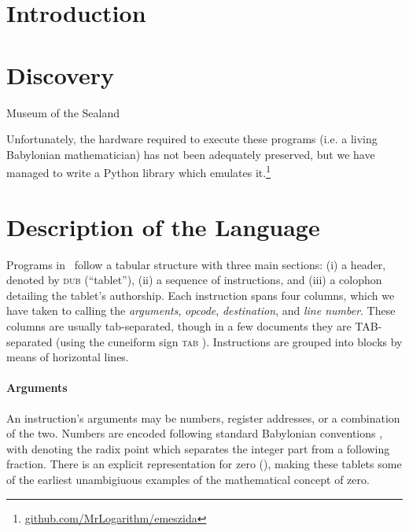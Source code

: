 \documentclass[11pt]{article}
\title{\emeszida}
\author{First Author \\
  Affiliation / Address line 1 \\
  Affiliation / Address line 2 \\
  Affiliation / Address line 3 \\
  \texttt{email@domain} \\\And
  Second Author \\
  Affiliation / Address line 1 \\
  Affiliation / Address line 2 \\
  Affiliation / Address line 3 \\
  \texttt{email@domain} \\}
\newcommand{\emeszida}{\textcuneiform{𒅴𒋃𒀀}}
\begin{document}
\maketitle
\begin{abstract}
This paper announces the discovery of the use of neural nets almost 4,000 years before their use in the modern era.
Newly discovered tablets preserve a perceptron used for calculating the numbers on Plimpton 322, the most important object in the history of mathematics.
The native programming language used by the ancient Babylonian "cuneogrammers" uses sexagesimal numbering leading to some "weirdness".
\end{abstract}

\begin{abstract}[]
test
\end{abstract}

\section{Introduction}

\cite{robson2002}

\section{Discovery}
Museum of the Sealand

Unfortunately, the hardware required to execute these programs (i.e. a living Babylonian mathematician) has not been adequately preserved, but we have managed to write a Python library which emulates it.\footnote{\url{github.com/MrLogarithm/emeszida}}


\section{Description of the Language}
Programs in \emeszida\ follow a tabular structure with three main sections: (i) a header, denoted by \textsc{dub}  (``tablet''), (ii) a sequence of instructions, and (iii) a colophon detailing the tablet's authorship.
Each instruction spans four columns, which we have taken to calling the \textit{arguments}, \textit{opcode}, \textit{destination}, and \textit{line number}. 
These columns are usually tab-separated, though in a few documents they are TAB-separated (using the cuneiform sign \textsc{tab} ).
Instructions are grouped into blocks by means of horizontal lines.

\paragraph{Arguments}
An instruction's arguments may be numbers, register addresses, or a combination of the two. Numbers are encoded following standard Babylonian conventions \cite{TODO}, with  denoting the radix point which separates the integer part from a following fraction. There is an explicit representation for zero (), making these tablets some of the earliest unambigiuous examples of the mathematical concept of zero.
\end{document}
